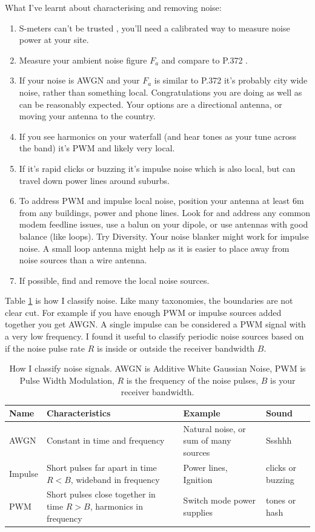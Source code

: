 \documentclass{article}
\begin{document}
What I've learnt about characterising and removing noise:
\begin{enumerate}
\item S-meters can't be trusted \cite{vu2nsb_s_meter}, you'll need a calibrated way to measure noise power at your site.
\item Measure your ambient noise figure $F_a$ and compare to P.372 \cite{itu372-16}.
\item If your noise is AWGN and your $F_a$ is similar to P.372 it's probably city wide noise, rather than something local. Congratulations you are doing as well as can be reasonably expected. Your options are a directional antenna, or moving your antenna to the country.
\item If you see harmonics on your waterfall (and hear tones as your tune across the band) it's PWM and likely very local.
\item If it's rapid clicks or buzzing it's impulse noise which is also local, but can travel down power lines around suburbs. 
\item To address PWM and impulse local noise, position your antenna at least 6m from any buildings, power and phone lines.  Look for and address any common modem feedline issues, use a balun on your dipole, or use antennas with good balance (like loops).  Try Diversity.  Your noise blanker might work for impulse noise.  A small loop antenna might help as it is easier to place away from noise sources than a wire antenna.
\item If possible, find and remove the local noise sources.
\end{enumerate}

Table \ref{table:noise_classes} is how I classify noise.  Like many taxonomies, the boundaries are not clear cut.  For example if you have enough PWM or impulse sources added together you get AWGN.  A single impulse can be considered a PWM signal with a very low frequency.  I found it useful to classify periodic noise sources based on if the noise pulse rate $R$ is inside or outside the receiver bandwidth $B$.
\begin{table}[h]
\centering
\begin{tabular}{ | m{1.2cm} | m{4cm} | m{3cm} | m{2cm} |}
 \hline\hline
 Name & Characteristics & Example & Sound \\
 \hline
 AWGN & Constant in time and frequency & Natural noise, or sum of many sources & Ssshhh \\
 \hline
 Impulse & Short pulses far apart in time $R<B$, wideband in frequency & Power lines, Ignition & clicks or buzzing \\
\hline PWM & Short pulses close together in time $R>B$, harmonics in frequency & Switch mode power supplies & tones or hash \\
 \hline
\end{tabular}
\caption{How I classify noise signals. AWGN is Additive White Gaussian Noise, PWM is Pulse Width Modulation, $R$ is the frequency of the noise pulses, $B$ is your receiver bandwidth.}
\label{table:noise_classes}
\end{table}
\end{document}
